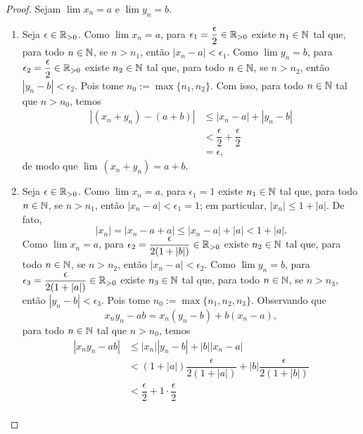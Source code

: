 \begin{proof}
    Sejam $\lim x_n = a$ e $\lim y_n = b$.
        \begin{enumerate}[leftmargin=*, align=left, label=\textbf{(\alph*)}]
            \item Seja $\epsilon \in \mathbb{R}_{>0}$. Como $\lim x_n = a$, para $\displaystyle \epsilon_1 = \dfrac{\epsilon}{2} \in \mathbb{R}_{>0}$ existe $n_1 \in \mathbb{N}$ tal que, para todo $n \in \mathbb{N}$, se $n > n_1$, então $|x_n - a| < \epsilon_1$. Como $\lim y_n = b$, para $\displaystyle \epsilon_2 = \dfrac{\epsilon}{2} \in \mathbb{R}_{>0}$ existe $n_2 \in \mathbb{N}$ tal que, para todo $n \in \mathbb{N}$, se $n > n_2$, então $|y_n - b| < \epsilon_2$. Pois tome $n_0 := \max \{n_1, n_2 \}$. Com isso, para todo $n \in \mathbb{N}$ tal que $n > n_0$, temos
                \begin{align*}
                    |(x_n + y_n) - (a + b)|
                        &\leq |x_n - a| + |y_n - b| \\
                        &< \dfrac{\epsilon}{2} + \dfrac{\epsilon}{2} \\
                        &= \epsilon,
                \end{align*}
            de modo que $\lim \, (x_n + y_n) = a + b$. \blackproof
            \item Seja $\epsilon \in \mathbb{R}_{>0}$. Como $\lim x_n = a$, para $\epsilon_1 = 1$ existe $n_1 \in \mathbb{N}$ tal que, para todo $n \in \mathbb{N}$, se $n > n_1$, então $|x_n - a| < \epsilon_1 = 1$; em particular, $|x_n| \leq 1 + |a|$. De fato, 
                \[
                    |x_n| = |x_n - a + a| \leq |x_n - a| + |a| < 1 + |a|.
                \]
            Como $\lim x_n = a$, para $\displaystyle \epsilon_2 = \dfrac{\epsilon}{2(1 + |b|)} \in \mathbb{R}_{>0}$ existe $n_2 \in \mathbb{N}$ tal que, para todo $n \in \mathbb{N}$, se $n > n_2$, então $|x_n - a| < \epsilon_2$. Como $\lim y_n = b$, para $\epsilon_3 = \dfrac{\epsilon}{2(1 + |a|)} \in \mathbb{R}_{>0}$ existe $n_3 \in \mathbb{N}$ tal que, para todo $n \in \mathbb{N}$, se $n > n_3$, então $|y_n - b| < \epsilon_3$. Pois tome $n_0 := \max \{n_1, n_2, n_3 \}$. Observando que
                \[
                    x_n y_n - a b = x_n (y_n - b) + b (x_n - a),
                \]
            para todo $n \in \mathbb{N}$ tal que $n > n_0$, temos
                \begin{align*}
                    |x_n y_n - a b|
                        &\leq |x_n| |y_n - b| + |b| |x_n - a| \\
                        &< (1+|a|) \dfrac{\epsilon}{2(1+|a|)} + |b| \dfrac{\epsilon}{2(1+|b|)} \\
                        &< \dfrac{\epsilon}{2} + 1 \cdot \dfrac{\epsilon}{2} \\

\end{align*}
\end{enumerate}
\end{proof}
